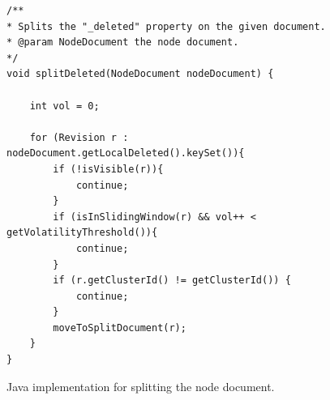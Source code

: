 \documentclass[abstracton,12pt]{scrreprt}
\begin{document}
\begin{figure}[h]
    \begin{framed}
        \begin{scriptsize}
            \begin{verbatim}
/**
* Splits the "_deleted" property on the given document.
* @param NodeDocument the node document.
*/
void splitDeleted(NodeDocument nodeDocument) {

    int vol = 0;

    for (Revision r : nodeDocument.getLocalDeleted().keySet()){
        if (!isVisible(r)){
            continue;
        }
        if (isInSlidingWindow(r) && vol++ < getVolatilityThreshold()){
            continue;
        }
        if (r.getClusterId() != getClusterId()) {
            continue;
        }
        moveToSplitDocument(r);
    }
}
            \end{verbatim}
        \end{scriptsize}
    \end{framed}
    \caption{Java implementation for splitting the node document.}
    \label{fig:split_document}
\end{figure}
\end{document}
